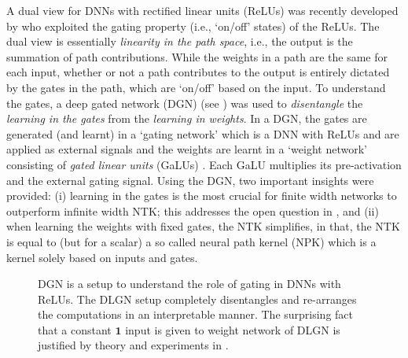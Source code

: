 A dual view for DNNs with rectified linear units (ReLUs) was recently developed by \cite{npk} who exploited the gating property (i.e., `on/off' states) of the ReLUs. The dual view is essentially \emph{linearity in the path space}, i.e., the output is the summation of path contributions.  While the weights in a path are the same for each input, whether or not a path contributes to the output is entirely dictated by the gates in the path, which are `on/off' based on the input. To understand the gates, a deep gated network (DGN) (see ) was used to \emph{disentangle} the \emph{learning in the gates} from the \emph{learning in weights}. In a DGN,  the gates are generated (and learnt) in a `gating network' which is a DNN with ReLUs and are applied as external signals and the weights are learnt in a `weight network' consisting of \emph{gated linear units} (GaLUs) \citep{sss}. Each GaLU multiplies its pre-activation and the external gating signal. Using the DGN, two important insights were provided:  (i) learning in the gates is the most crucial for finite width networks to outperform infinite width NTK; this addresses the open question in \cite{arora2019exact}, and (ii) when learning the weights with fixed gates, the NTK simplifies, in that, the NTK is equal to (but for a scalar) a so called neural path kernel (NPK) which is a kernel solely based on inputs and gates.
\begin{figure}[!t]
\centering
\begin{minipage}{1.0\columnwidth}
\centering
\begin{minipage}{0.49\columnwidth}
\centering

\resizebox{0.8\columnwidth}{!}{

}
\end{minipage}
\begin{minipage}{0.49\columnwidth}
\centering

\resizebox{0.8\columnwidth}{!}{

}
\end{minipage}

\end{minipage}
\caption{\small{DGN is a setup to understand the role of gating in DNNs with ReLUs. The DLGN setup completely disentangles and re-arranges the computations in an interpretable manner. The surprising fact that a constant $\mathbf{1}$ input is given to weight network of DLGN is justified by theory and experiments in .}}
\label{fig:lgln}
\end{figure}

